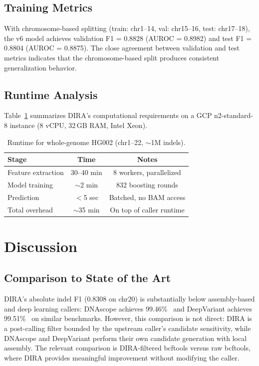 \documentclass[sigconf]{acmart}
\begin{document}
\subsection{Training Metrics}
With chromosome-based splitting (train: chr1--14, val: chr15--16, test: chr17--18), the v6 model achieves validation F1 = 0.8828 (AUROC = 0.8982) and test F1 = 0.8804 (AUROC = 0.8875). The close agreement between validation and test metrics indicates that the chromosome-based split produces consistent generalization behavior.

\subsection{Runtime Analysis}
Table~\ref{tab:runtime} summarizes DIRA's computational requirements on a GCP n2-standard-8 instance (8 vCPU, 32\,GB RAM, Intel Xeon).

\begin{table}[h]
\caption{Runtime for whole-genome HG002 (chr1--22, $\sim$1M indels).}
\label{tab:runtime}
\begin{tabular}{lcc}
\toprule
\textbf{Stage} & \textbf{Time} & \textbf{Notes} \\
\midrule
Feature extraction & 30--40 min & 8 workers, parallelized \\
Model training & $\sim$2 min & 832 boosting rounds \\
Prediction & $<$5 sec & Batched, no BAM access \\
\midrule
Total overhead & $\sim$35 min & On top of caller runtime \\
\bottomrule
\end{tabular}
\end{table}

\section{Discussion}

\subsection{Comparison to State of the Art}
DIRA's absolute indel F1 (0.8308 on chr20) is substantially below assembly-based and deep learning callers: DNAscope achieves 99.46\%~\cite{freed2022dnascope} and DeepVariant achieves 99.51\%~\cite{poplin2018universal} on similar benchmarks. However, this comparison is not direct: DIRA is a post-calling filter bounded by the upstream caller's candidate sensitivity, while DNAscope and DeepVariant perform their own candidate generation with local assembly. The relevant comparison is DIRA-filtered bcftools versus raw bcftools, where DIRA provides meaningful improvement without modifying the caller.
\end{document}
